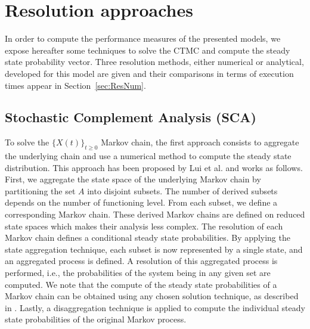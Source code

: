 \documentclass[conference]{IEEEtran}
\begin{document}
\section{Resolution approaches} %
\label{sec:ResModel}
In order to compute the performance measures of the presented models, we expose hereafter some techniques to solve the CTMC and compute 
the steady state probability vector. Three resolution methods, either numerical or analytical, 
developed for this model are given and their comparisons in terms of execution times appear in Section~\ref{sec:ResNum}.

\subsection{Stochastic Complement Analysis (SCA)} %

\label{sec:SCA}
To solve the $\{X(t)\}_{t \geq 0}$ Markov chain, the first approach consists to aggregate the underlying chain and use a numerical method to compute 
the steady state distribution. This approach has been proposed by Lui et al. \cite{lui1999stochastic}
and works as follows. First, we aggregate the state space of the underlying Markov chain by partitioning the set $A$ into disjoint subsets. 
The number of derived subsets depends on the number of functioning level. From each subset, we define a corresponding Markov chain. 
These derived Markov chains are defined on reduced state spaces which makes their analysis less complex. 
The resolution of each Markov chain defines a conditional steady state probabilities.
By applying the state aggregation technique, each subset is now represented by a single state, and an aggregated process is defined. 
A resolution of this aggregated process is performed, i.e., the probabilities of the system being in any given set are computed. 
We note that the compute of the steady state probabilities of a Markov chain can be obtained using any chosen solution technique, 
as described in \cite{Stew95}.
Lastly, a disaggregation technique is applied to compute the individual steady state probabilities of the original Markov process.

\end{document}
